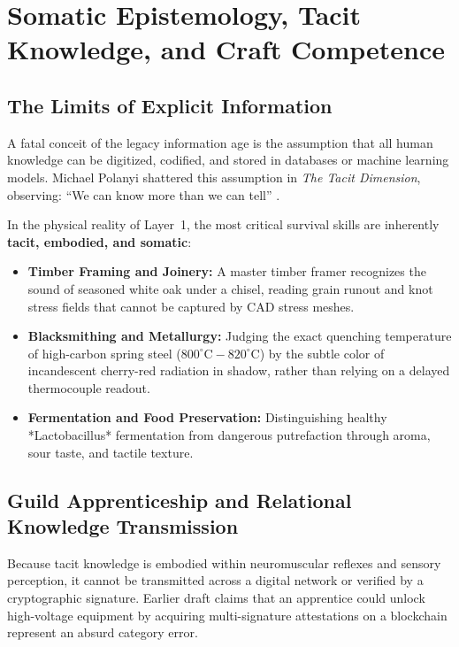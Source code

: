 \section{Somatic Epistemology, Tacit Knowledge, and Craft Competence}
\label{sec:tacit_knowledge}

\subsection{The Limits of Explicit Information}
A fatal conceit of the legacy information age is the assumption that all human knowledge can be digitized, codified, and stored in databases or machine learning models. Michael Polanyi shattered this assumption in \textit{The Tacit Dimension}, observing: ``We can know more than we can tell'' \cite{polanyi1966}.

In the physical reality of Layer~1, the most critical survival skills are inherently \textbf{tacit, embodied, and somatic}:
\begin{itemize}
    \item \textbf{Timber Framing and Joinery:} A master timber framer recognizes the sound of seasoned white oak under a chisel, reading grain runout and knot stress fields that cannot be captured by CAD stress meshes.
    \item \textbf{Blacksmithing and Metallurgy:} Judging the exact quenching temperature of high-carbon spring steel ($800^\circ\mathrm{C} - 820^\circ\mathrm{C}$) by the subtle color of incandescent cherry-red radiation in shadow, rather than relying on a delayed thermocouple readout.
    \item \textbf{Fermentation and Food Preservation:} Distinguishing healthy *Lactobacillus* fermentation from dangerous putrefaction through aroma, sour taste, and tactile texture.
\end{itemize}

\subsection{Guild Apprenticeship and Relational Knowledge Transmission}
Because tacit knowledge is embodied within neuromuscular reflexes and sensory perception, it cannot be transmitted across a digital network or verified by a cryptographic signature. Earlier draft claims that an apprentice could unlock high-voltage equipment by acquiring multi-signature attestations on a blockchain represent an absurd category error.

